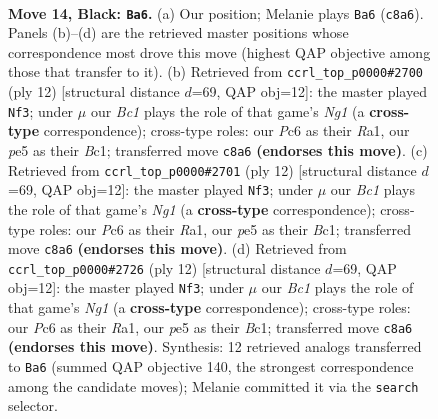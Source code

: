 \documentclass[11pt]{article}
\begin{document}
\clearpage

\begin{figure}[p]\centering
\begin{subfigure}{0.46\textwidth}\centering
\resizebox{\linewidth}{!}{%
\newchessgame
\chessboard[
  setfen={rnbqkbr1/p4ppp/2p1p3/2PpP3/PP3PPP/2P5/3N4/R1BQK1NR b KQq - 0 14},
  showmover=false,
  pgfstyle=straightmove, color=movearrow, markmove={c8-a6}
]}
\caption{}
\end{subfigure}\hfill
\begin{subfigure}{0.46\textwidth}\centering
\resizebox{\linewidth}{!}{%
\newchessgame
\chessboard[
  setfen={rnbqk2r/pp2nppp/4p3/2ppP3/3P4/P1P5/2P2PPP/R1BQKBNR w KQkq - 1 7},
  showmover=false,
  pgfstyle=straightmove, color=movearrow, markmove={g1-f3}
]}
\caption{}
\end{subfigure}
\\[4pt]
\begin{subfigure}{0.46\textwidth}\centering
\resizebox{\linewidth}{!}{%
\newchessgame
\chessboard[
  setfen={rnbqk2r/pp2nppp/4p3/2ppP3/3P4/P1P5/2P2PPP/R1BQKBNR w KQkq - 1 7},
  showmover=false,
  pgfstyle=straightmove, color=movearrow, markmove={g1-f3}
]}
\caption{}
\end{subfigure}\hfill
\begin{subfigure}{0.46\textwidth}\centering
\resizebox{\linewidth}{!}{%
\newchessgame
\chessboard[
  setfen={rnbqk2r/pp2nppp/4p3/2ppP3/3P4/P1P5/2P2PPP/R1BQKBNR w KQkq - 1 7},
  showmover=false,
  pgfstyle=straightmove, color=movearrow, markmove={g1-f3}
]}
\caption{}
\end{subfigure}
\caption{\textbf{Move 14, Black: \texttt{Ba6}.} (a) Our position; Melanie plays \texttt{Ba6} (\texttt{c8a6}). Panels (b)--(d) are the retrieved master positions whose correspondence most drove this move (highest QAP objective among those that transfer to it). (b) Retrieved from \texttt{ccrl\_top\_p0000\#2700} (ply 12) [structural distance $d$=69, QAP obj=12]: the master played \texttt{Nf3}; under $\mu$ our \emph{Bc1} plays the role of that game's \emph{Ng1} (a \textbf{cross-type} correspondence); cross-type roles: our \emph{P}c6 as their \emph{R}a1, our \emph{p}e5 as their \emph{B}c1; transferred move \texttt{c8a6} \textbf{(endorses this move)}. (c) Retrieved from \texttt{ccrl\_top\_p0000\#2701} (ply 12) [structural distance $d$=69, QAP obj=12]: the master played \texttt{Nf3}; under $\mu$ our \emph{Bc1} plays the role of that game's \emph{Ng1} (a \textbf{cross-type} correspondence); cross-type roles: our \emph{P}c6 as their \emph{R}a1, our \emph{p}e5 as their \emph{B}c1; transferred move \texttt{c8a6} \textbf{(endorses this move)}. (d) Retrieved from \texttt{ccrl\_top\_p0000\#2726} (ply 12) [structural distance $d$=69, QAP obj=12]: the master played \texttt{Nf3}; under $\mu$ our \emph{Bc1} plays the role of that game's \emph{Ng1} (a \textbf{cross-type} correspondence); cross-type roles: our \emph{P}c6 as their \emph{R}a1, our \emph{p}e5 as their \emph{B}c1; transferred move \texttt{c8a6} \textbf{(endorses this move)}. Synthesis: 12 retrieved analogs transferred to \texttt{Ba6} (summed QAP objective 140, the strongest correspondence among the candidate moves); Melanie committed it via the \texttt{search} selector.}
\label{fig:thought-m27}
\end{figure}
\end{document}
